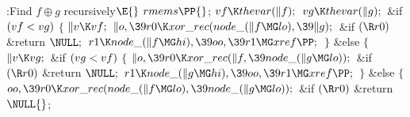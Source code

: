 \B{}:Find $f\oplus g$ recursively\X${}\E{}$\6
$\\{rmems}\PP{}$;\6
${}\\{vf}\K\\{thevar}(\|f);{}$\6
${}\\{vg}\K\\{thevar}(\|g);{}$\6
\&{if} ${}(\\{vf}<\\{vg}){}$\5
${}\{{}$\1\6
${}\|v\K\\{vf};{}$\6
${}\|o,\39\\{r0}\K\\{xor\_rec}(\\{node\_}(\|f\MG\\{lo}),\39\|g);{}$\6
\&{if} ${}(\R\\{r0}){}$\1\5
\&{return} ${}\NULL;{}$\2\6
${}\\{r1}\K\\{node\_}(\|f\MG\\{hi}),\39\\{oo},\39\\{r1}\MG\\{xref}\PP;{}$\6
\4${}\}{}$\5
\2\&{else}\5
${}\{{}$\1\6
${}\|v\K\\{vg};{}$\6
\&{if} ${}(\\{vg}<\\{vf}){}$\5
${}\{{}$\1\6
${}\|o,\39\\{r0}\K\\{xor\_rec}(\|f,\39\\{node\_}(\|g\MG\\{lo}));{}$\6
\&{if} ${}(\R\\{r0}){}$\1\5
\&{return} ${}\NULL;{}$\2\6
${}\\{r1}\K\\{node\_}(\|g\MG\\{hi}),\39\\{oo},\39\\{r1}\MG\\{xref}\PP;{}$\6
\4${}\}{}$\5
\2\&{else}\5
${}\{{}$\1\6
${}\\{oo},\39\\{r0}\K\\{xor\_rec}(\\{node\_}(\|f\MG\\{lo}),\39\\{node\_}(\|g\MG%
\\{lo}));{}$\6
\&{if} ${}(\R\\{r0}){}$\1\5
\&{return} ${}\NULL{}$;\2\6
